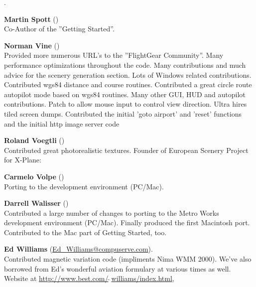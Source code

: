  .
 \medskip

\noindent \textbf{Martin Spott} ()\\
 Co-Author of the ''Getting Started''.
\medskip

\noindent \textbf{Norman Vine} ()\\
  Provided more numerous URL's to the ''FlightGear Community''.
  Many performance optimizations throughout the code.  Many contributions
  and much advice for the scenery generation section.  Lots of Windows
  related contributions. Contributed wgs84 distance and course routines.
  Contributed a great circle route autopilot mode based on wgs84 routines.
  Many other GUI, HUD and autopilot contributions.  Patch to allow mouse input to control view direction. Ultra hires tiled screen dumps. Contributed the initial 'goto airport' and 'reset' functions and the initial http image server code
\medskip

\noindent \textbf{Roland Voegtli}
()\\
 Contributed great photorealistic textures.   Founder of European Scenery Project for
 X-Plane:
 \medskip

\medskip


\noindent \textbf{Carmelo Volpe}
()\\
  Porting \FlightGear{} to the  development environment
  (PC/Mac).
 \medskip

\noindent \textbf{Darrell Walisser}
()\\
 Contributed a large number of changes to porting \FlightGear{} to the Metro Works development environment (PC/Mac). Finally produced the first Macintosh port. Contributed to the Mac part of Getting Started, too.
\medskip

\noindent \textbf{Ed Williams}
(\href{Ed_Williams@compuserve.com}{Ed\_Williams@compuserve.com}).\\
  Contributed magnetic variation code (impliments Nima WMM 2000).
  We've also borrowed from Ed's wonderful aviation formulary at various
  times as well. Website at
  \medskip
  \href{http://www.best.com/~williams/index.html}{http://www.best.com/$\tilde{~~}$williams/index.html},
 \medskip

